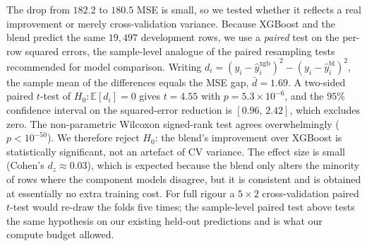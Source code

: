 \documentclass[11pt]{article}
\begin{document}
The drop from $182.2$ to $180.5$ MSE is small, so we tested whether it reflects a real improvement or merely cross-validation variance. Because XGBoost and the blend predict the same $19{,}497$ development rows, we use a \emph{paired} test on the per-row squared errors, the sample-level analogue of the paired resampling tests recommended for model comparison. Writing $d_i=(y_i-\hat y_i^{\mathrm{xgb}})^{2}-(y_i-\hat y_i^{\mathrm{bl}})^{2}$, the sample mean of the differences equals the MSE gap, $\bar d=1.69$. A two-sided paired $t$-test of $H_0:\mathbb{E}[d_i]=0$ gives $t=4.55$ with $p=5.3\times10^{-6}$, and the $95\%$ confidence interval on the squared-error reduction is $[0.96,\,2.42]$, which excludes zero. The non-parametric Wilcoxon signed-rank test agrees overwhelmingly ($p<10^{-50}$). We therefore reject $H_0$: the blend's improvement over XGBoost is statistically significant, not an artefact of CV variance. The effect size is small (Cohen's $d_z\approx0.03$), which is expected because the blend only alters the minority of rows where the component models disagree, but it is consistent and is obtained at essentially no extra training cost. For full rigour a $5\times2$ cross-validation paired $t$-test would re-draw the folds five times; the sample-level paired test above tests the same hypothesis on our existing held-out predictions and is what our compute budget allowed.
\end{document}
